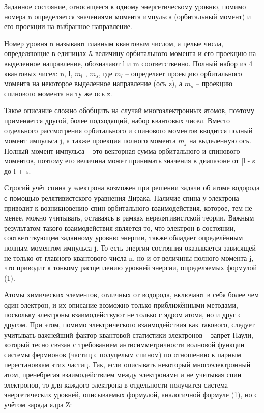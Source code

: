 \documentclass[a4paper, 12pt]{article}%
\begin{document}
	
	Заданное состояние, относящееся к одному энергетическому уровню, помимо номера n определяется значениями момента импульса (орбитальный момент) и его проекции на выбранное направление.
	
	
	Номер уровня
	n называют главным квантовым числом, а целые числа, определяющие
	в единицах $\hbar$ величину орбитального момента и его проекцию на выделенное направление, обозначают l и m соответственно. Полный
	набор из 4 квантовых чисел: n, l, $m_l$
	, $m_s$, где $m_l$ – определяет проекцию
	орбитального момента на некоторое выделенное направление (ось z), а
	$m_s$ – проекцию спинового момента на ту же ось z.
	
	
	Такое описание сложно обобщить на случай многоэлектронных атомов, поэтому применяется другой, более подходящий, набор квантовых чисел. Вместо отдельного рассмотрения орбитального и спинового моментов вводится полный момент импульса j, а также проекция
	полного момента $m_j$ на выделенную ось. Полный момент импульса –
	это векторная сумма орбитального и спинового моментов, поэтому его
	величина может принимать значения в диапазоне от |l - s| до l + s.
	
	
	Строгий учёт спина у электрона возможен при решении задачи об
	атоме водорода с помощью релятивистского уравнения Дирака. Наличие спина у электрона приводит к возникновению спин-орбитального
	взаимодействия, которое, тем не менее, можно учитывать, оставаясь в рамках нерелятивистской теории. Важным результатом такого взаимодействия является то, что электрон в состоянии, соответствующем заданному уровню энергии, также обладает
	определённым полным моментом импульса j. То есть энергия состояния
	оказывается зависящей не только от главного квантового числа n, но
	и от величины полного момента j, что приводит к тонкому расщеплению уровней энергии, определяемых формулой (1). 
	
	
	Атомы химических элементов, отличных от водорода, включают в
	себя более чем один электрон, и их описание возможно только приближёнными методами, поскольку электроны взаимодействуют не только
	с ядром атома, но и друг с другом. При этом, помимо электрического взаимодействия как такового, следует учитывать важнейший фактор квантовой статистики электронов – запрет Паули, который тесно
	связан с требованием антисимметричности волновой функции системы
	фермионов (частиц с полуцелым спином) по отношению к парным перестановкам этих частиц.
	Так, если описывать некоторый многоэлектронный
	атом, пренебрегая взаимодействием между электронами и не учитывая
	спин электронов, то для каждого электрона в отдельности получится система энергетических уровней, описываемых формулой, аналогичной
	формуле (1), но с учётом заряда ядра Z:
	
\end{document}
